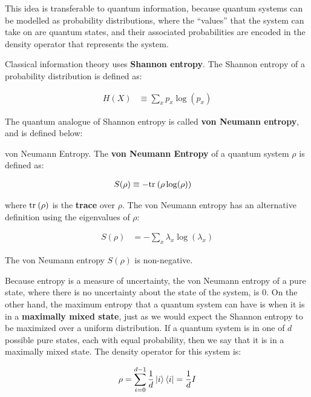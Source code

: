 This idea is transferable to quantum information, because quantum systems can be modelled as probability distributions, where the ``values'' that the system can take on are quantum states, and their associated probabilities are encoded in the density operator that represents the system.

Classical information theory uses \textbf{Shannon entropy}. The Shannon entropy of a probability distribution is defined as:

\begin{align}
    H(X) &\equiv \sum_x p_x \log (p_x)
\end{align}


The quantum analogue of Shannon entropy is called \textbf{von Neumann entropy}, and is defined below:

\begin{definition}{von Neumann Entropy.}
    The \textbf{von Neumann Entropy} of a quantum system $\rho$ is defined as:
    
    \begin{align}
        S(\rho) &\equiv -\text{tr}_{}\left( {\rho \log(\rho)} \right)
    \end{align}
    
    where $\text{tr}_{}\left( {\rho} \right)$ is the \textbf{trace} over $\rho$. The von Neumann entropy has an alternative definition using the eigenvalues of $\rho$:

    \begin{align}
        S(\rho) &= -\sum_x \lambda_x \log(\lambda_x)
    \end{align}
\end{definition}

\begin{remark}
    The von Neumann entropy $S(\rho)$ is non-negative.
\end{remark}

Because entropy is a measure of uncertainty, the von Neumann entropy of a pure state, where there is no uncertainty about the state of the system, is 0. On the other hand, the maximum entropy that a quantum system can have is when it is in a \textbf{maximally mixed state}, just as we would expect the Shannon entropy to be maximized over a uniform distribution. If a quantum system is in one of $d$ possible pure states, each with equal probability, then we say that it is in a maximally mixed state. The density operator for this system is:

\begin{align}
    \rho = \sum_{i=0}^{d-1} \frac{1}{d}\ket{i}\bra{i} = \frac{1}{d} I
\end{align}

